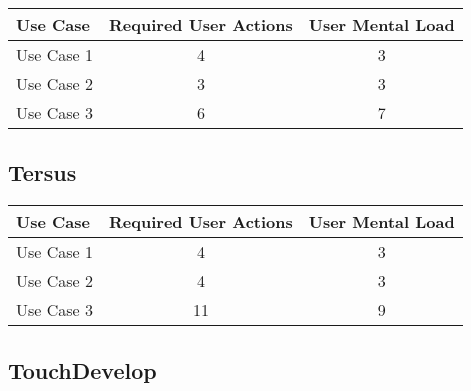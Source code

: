 \begin{tabularx}{\textwidth}{Xcc}
\textbf{Use Case} & \textbf{Required User Actions} & \textbf{User Mental Load}\\
\hline
Use Case 1                          & 4 & 3 \\
Use Case 2                          & 3 & 3 \\
Use Case 3                          & 6 & 7
\end{tabularx}

\subsection*{Tersus}




\begin{tabularx}{\textwidth}{Xcc}
\textbf{Use Case} & \textbf{Required User Actions} & \textbf{User Mental Load}\\
\hline
Use Case 1                          & 4 & 3 \\
Use Case 2                          & 4 & 3 \\
Use Case 3                          & 11 & 9
\end{tabularx}

\subsection*{TouchDevelop}

